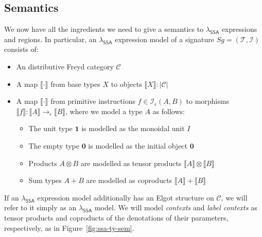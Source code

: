 \documentclass[acmsmall,screen,review]{acmart}
\newcommand{\mc}[1]{\ensuremath{\mathcal{#1}}}
\newcommand{\mb}[1]{\ensuremath{\mathbf{#1}}}
\newcommand{\ms}[1]{\ensuremath{\mathsf{#1}}}
\newcommand{\dnt}[1]{\llbracket{#1}\rrbracket}
\newcommand{\isotopessa}{\(\lambda_{\ms{SSA}}\)}
\begin{document}
\subsection{Semantics}

We now have all the ingredients we need to give a semantics to \isotopessa{} expressions and
regions. In particular, an \isotopessa{} expression model of a signature $Sg = (\mc{T}, \mc{I})$
consists of:
\begin{itemize}
  \item An distributive Freyd category $\mc{C}$
  \item A map $\dnt{\cdot}$ from base types $X$ to objects $\dnt{X} : |\mc{C}|$
  \item A map $\dnt{\cdot}$ from primitive instructions $f \in \mc{I}_\epsilon(A, B)$ to morphisms
  $\dnt{f} : \dnt{A} \to_\epsilon \dnt{B}$, where we model a type $A$ as follows:
  \begin{itemize}
    \item The unit type $\mb{1}$ is modelled as the monoidal unit $I$
    \item The empty type $\mb{0}$ is modelled as the initial object $\mb{0}$
    \item Products $A \otimes B$ are modelled as tensor products $\dnt{A} \otimes \dnt{B}$
    \item Sum types $A + B$ are modelled as coproducts $\dnt{A} + \dnt{B}$
  \end{itemize}
\end{itemize}
If an \isotopessa{} expression model additionally has an Elgot structure on $\mc{C}$, we will refer
to it simply as an \isotopessa{} model. We will model \emph{contexts} and \emph{label contexts} as
tensor products and coproducts of the denotations of their parameters, respectively, as in
Figure~\ref{fig:ssa-ty-sem}.
\end{document}
